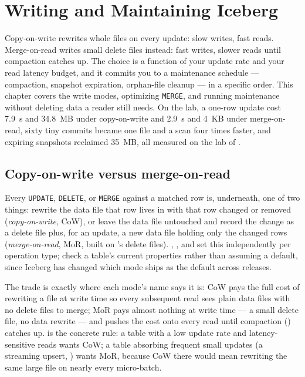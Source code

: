 \chapter{Writing and Maintaining Iceberg}
\label{ch:iceberg-write}

\begin{chapterintro}
Copy-on-write rewrites whole files on every update: slow writes, fast reads.
Merge-on-read writes small delete files instead: fast writes, slower reads until
compaction catches up. The choice is a function of your update rate and your read
latency budget, and it commits you to a maintenance schedule --- compaction,
snapshot expiration, orphan-file cleanup --- in a specific order. This chapter
covers the write modes, optimizing \texttt{MERGE}, and running maintenance
without deleting data a reader still needs. On the lab, a one-row update cost
7.9~s and 34.8~MB under copy-on-write and 2.9~s and 4~KB under merge-on-read,
sixty tiny commits became one file and a scan four times faster, and expiring
snapshots reclaimed 35~MB, all measured on the lab of .
\end{chapterintro}

\section{Copy-on-write versus merge-on-read}
\label{sec:ice-write-cow-mor}

Every \texttt{UPDATE}, \texttt{DELETE}, or \texttt{MERGE} against a matched
row is, underneath, one of two things: rewrite the data file that row lives
in with that row changed or removed (\emph{copy-on-write}, CoW), or leave the
data file untouched and record the change as a delete file plus, for an
update, a new data file holding only the changed rows
(\emph{merge-on-read}, MoR, built on 's delete
files). , , and
 set this independently per operation type; check a
table's current properties rather than assuming a default, since Iceberg has
changed which mode ships as the default across releases.

The trade is exactly where each mode's name says it is: CoW pays the full
cost of rewriting a file at write time so every subsequent read sees plain
data files with no delete files to merge; MoR pays almost nothing at write
time --- a small delete file, no data rewrite --- and pushes the cost onto
every read until compaction () catches up.
 is the concrete rule: a table with a low update rate
and latency-sensitive reads wants CoW; a table absorbing frequent small
updates (a streaming upsert, ) wants MoR, because CoW
there would mean rewriting the same large file on nearly every micro-batch.

